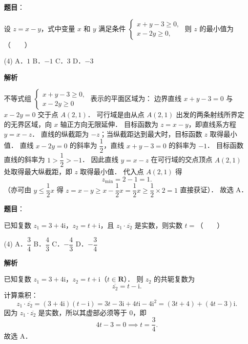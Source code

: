 \begin{answer}

\textbf{题目}：

设 $z = x - y$，式中变量 $x$ 和 $y$ 满足条件 $\begin{cases} x + y - 3 \geqslant 0, \\ x - 2y \geqslant 0, \end{cases}$ 则 $z$ 的最小值为\mbox{（　　）}

\begin{gkopts}(4)
\task A．$1$
\task B．$-1$
\task C．$3$
\task D．$-3$
\end{gkopts}

\textbf{解析}

不等式组 $\begin{cases} x + y - 3 \geqslant 0, \\ x - 2y \geqslant 0 \end{cases}$ 表示的平面区域为：
边界直线 $x + y - 3 = 0$ 与 $x - 2y = 0$ 交于点 $A(2, 1)$．
可行域是由从点 $A(2, 1)$ 出发的两条射线所界定的无界区域，向 $x$ 轴正方向无限延伸．
目标函数为 $z = x - y$，即直线系方程 $y = x - z$．
直线的纵截距为 $-z$；当纵截距达到最大时，目标函数 $z$ 取得最小值．
直线 $x - 2y = 0$ 的斜率为 $\dfrac{1}{2}$，直线 $x + y - 3 = 0$ 的斜率为 $-1$．
目标函数直线的斜率为 $1 > \dfrac{1}{2} > -1$．
因此直线 $y = x - z$ 在可行域的交点顶点 $A(2, 1)$ 处取得最大纵截距，即 $z$ 取得最小值．
代入点 $A(2, 1)$ 得
\nopagebreak[4]
\[
z_{\min} = 2 - 1 = 1.
\]
（亦可由 $y \leqslant \dfrac{1}{2}x$ 得 $z = x - y \geqslant x - \dfrac{1}{2}x = \dfrac{1}{2}x \geqslant \dfrac{1}{2} \times 2 = 1$ 直接获证）．
故选 A．


\end{answer}
\begin{answer}

\textbf{题目}：

已知复数 $z_1 = 3 + 4\mathrm{i}$，$z_2 = t + \mathrm{i}$，且 $z_1 \cdot \overline{z_2}$ 是实数，则实数 $t =$\mbox{（　　）}

\begin{gkopts}(4)
\task A．$\dfrac{3}{4}$
\task B．$\dfrac{4}{3}$
\task C．$-\dfrac{4}{3}$
\task D．$-\dfrac{3}{4}$
\end{gkopts}

\textbf{解析}

已知复数 $z_1 = 3 + 4\mathrm{i}$，$z_2 = t + \mathrm{i}$（$t \in \mathbf{R}$）．
则 $z_2$ 的共轭复数为
\nopagebreak[4]
\[
\overline{z_2} = t - \mathrm{i}.
\]
计算乘积：
\nopagebreak[4]
\[
z_1 \cdot \overline{z_2} = (3 + 4\mathrm{i})(t - \mathrm{i}) = 3t - 3\mathrm{i} + 4t\mathrm{i} - 4\mathrm{i}^2 = (3t + 4) + (4t - 3)\mathrm{i}.
\]
因为 $z_1 \cdot \overline{z_2}$ 是实数，所以其虚部必须等于 $0$，即
\nopagebreak[4]
\[
4t - 3 = 0 \implies t = \frac{3}{4}.
\]
故选 A．


\end{answer}
